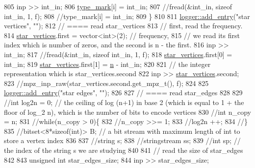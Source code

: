 \begin{DoxyCode}
805     inp >> int\_in;
806     \hyperlink{classmarked__graph__compressed_a86b00223525703e973415cbc9c94da68}{type\_mark}[i] = int\_in;
807     \textcolor{comment}{//fread(&int\_in, sizeof int\_in, 1, f);}
808     \textcolor{comment}{//type\_mark[i] = int\_in;}
809   \}
810 
811   \hyperlink{classlogger_a710163deb17bc81f70d53d285b8ac9ac}{logger::add\_entry}(\textcolor{stringliteral}{"star vertices"}, \textcolor{stringliteral}{""});
812   \textcolor{comment}{// ==== read star\_vertices}
813   \textcolor{comment}{// first, read the frequency.}
814   \hyperlink{classmarked__graph__compressed_a7a4ced4586e2e353f9076bd447df5208}{star\_vertices}.first = vector<int>(2); \textcolor{comment}{// frequency,}
815   \textcolor{comment}{// we read its first index which is number of zeros, and the second is n - the first.}
816   inp >> int\_in;
817   \textcolor{comment}{//fread(&int\_in, sizeof int\_in, 1, f);}
818   \hyperlink{classmarked__graph__compressed_a7a4ced4586e2e353f9076bd447df5208}{star\_vertices}.first[0] = int\_in;
819   \hyperlink{classmarked__graph__compressed_a7a4ced4586e2e353f9076bd447df5208}{star\_vertices}.first[1] = \hyperlink{classmarked__graph__compressed_a8d841016ddb11cfd33748c8deb6277ba}{n} - int\_in;
820 
821   \textcolor{comment}{// the integer representation which is star\_vertices.second}
822   inp >> \hyperlink{classmarked__graph__compressed_a7a4ced4586e2e353f9076bd447df5208}{star\_vertices}.second;
823   \textcolor{comment}{//mpz\_inp\_raw(star\_vertices.second.get\_mpz\_t(), f);}
824 
825   \hyperlink{classlogger_a710163deb17bc81f70d53d285b8ac9ac}{logger::add\_entry}(\textcolor{stringliteral}{"star edges"}, \textcolor{stringliteral}{""});
826 
827   \textcolor{comment}{// ==== read star\_edges}
828 
829   \textcolor{comment}{//int log2n = 0; // the ceiling of log (n+1) in base 2 (which is equal to 1 + the floor of log\_2 n),
       which is the number of bits to encode vertices}
830   \textcolor{comment}{//int n\_copy = n;}
831   \textcolor{comment}{//while(n\_copy > 0)\{}
832   \textcolor{comment}{//n\_copy >>= 1;}
833   \textcolor{comment}{//log2n ++;}
834   \textcolor{comment}{//\}}
835   \textcolor{comment}{//bitset<8*sizeof(int)> B; // a bit stream with maximum length of int to store a vertex index}
836 
837   \textcolor{comment}{//string s;}
838   \textcolor{comment}{//stringstream ss;}
839   \textcolor{comment}{//int sp; // the index of the string s we are studying }
840 
841   \textcolor{comment}{// read the size of star\_edges}
842 
843   \textcolor{keywordtype}{unsigned} \textcolor{keywordtype}{int} star\_edges\_size;
844   inp >> star\_edges\_size;

\end{DoxyCode}
